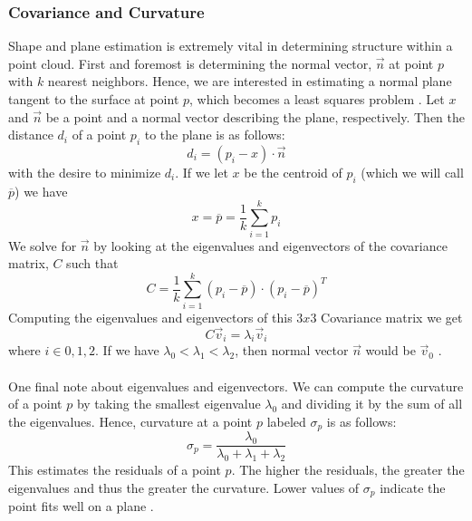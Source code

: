 \documentclass[11pt]{article}
\theoremstyle{definition}
\begin{document}
\subsubsection{Covariance and Curvature}\label{subsub:cov}
Shape and plane estimation is extremely vital in determining structure within a point cloud.   First and foremost is determining the normal vector, $\vec{n}$ at point $p$ with $k$ nearest neighbors.  Hence, we are interested in estimating a normal plane tangent to the surface at point $p$, which becomes a least squares problem \cite{RusuDoctoralDissertation}.  Let $x$ and $\vec{n}$ be a point and a normal vector describing the plane, respectively.  Then the distance $d_i$ of a point $p_i$ to the plane is as follows:
\begin{equation}\label{eqn:least_square}
d_i = (p_i - x)\cdot{\vec{n}}
\end{equation}
with the desire to minimize $d_i$.   If we let $x$ be the centroid of $p_i$ (which we will call $\overline{p}$) we have
\begin{equation}\label{eqn:centroid}
x = \overline{p} = \frac{1}{k}\sum_{i=1}^{k}p_i
\end{equation}
We solve for $\vec{n}$ by looking at the eigenvalues and eigenvectors of the covariance matrix, $C$ such that
\begin{equation}\label{eqn:cov}
C = \frac{1}{k}\sum_{i=1}^{k}(p_i - \overline{p})\cdot(p_i - \overline{p})^T
\end{equation}
Computing the eigenvalues and eigenvectors of this $3x3$ Covariance matrix we get 
\begin{equation}\label{eqn:eigen}
C\vec{v}_i = \lambda_i\vec{v}_i 
\end{equation}
where $i \in {0,1,2}$.  If we have $\lambda_0 < \lambda_1 < \lambda_2$, then normal vector $\vec{n}$ would be $\vec{v}_0$ \cite{RusuDoctoralDissertation}.  
\\\\
One final note about eigenvalues and eigenvectors.  We can compute the curvature of a point $p$ by taking the smallest eigenvalue $\lambda_0$ and dividing it by the sum of all the eigenvalues.  Hence, curvature at a point $p$ labeled $\sigma_p$ is as follows:
\begin{equation}\label{eqn:curvature}
\sigma_p = \frac{\lambda_0}{\lambda_0 + \lambda_1 + \lambda_2}
\end{equation}
This estimates the residuals of a point $p$.  The higher the residuals, the greater the eigenvalues and thus the greater the curvature.  Lower values of $\sigma_p$ indicate the point fits well on a plane \cite{RusuDoctoralDissertation}.  
\end{document}

